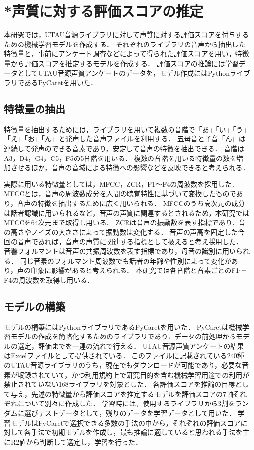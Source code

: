 \documentclass[a4j,8pt,twocolumn]{extarticle}
\begin{document}
\section{*声質に対する評価スコアの推定}
本研究では，UTAU音源ライブラリに対して声質に対する評価スコアを付与するための機械学習モデルを作成する．
それぞれのライブラリの音声から抽出した特徴量と，事前にアンケート調査などによって得られた評価スコアを用い，特徴量から評価スコアを推定するモデルを作成する．
評価スコアの推論には学習データとしてUTAU音源声質アンケートのデータを，モデル作成にはPythonライブラリであるPyCaretを用いた．

\subsection{特徴量の抽出}
特徴量を抽出するためには，ライブラリを用いて複数の音階で「あ」「い」「う」「え」「お」「ん」と発声した音声ファイルを利用する．
五母音と子音「ん」は連続して発声のできる音素であり，安定して音声の特徴を抽出できる．
音階はA3，D4，G4，C5，F5の5音階を用いる．
複数の音階を用いる特徴量の数を増加させるほか，音声の音域による特徴への影響などを反映できると考えられる．

実際に用いる特徴量としては，MFCC，ZCR，F1〜F4の周波数を採用した．
MFCCとは，音声の周波数成分を人間の聴覚特性に基づいて変換したものであり，音声の特徴を抽出するために広く用いられる．
MFCCのうち高次元の成分は話者認識に用いられるなど，音声の声質に関連するとされる\cite{}ため，本研究ではMFCCを64次元まで取得し用いる．
ZCRは音声の振動数を表す指標であり，音の高さやノイズの大きさによって振動数は変化する．
音声の声高を固定した今回の音声であれば，音声の声質に関連する指標として扱えると考え採用した．
音響フォルマントは音声の共振周波数を表す指標であり，母音の識別に用いられる．
同じ音素のフォルマント周波数でも話者の年齢や性別によって変化があり\cite{formant}，声の印象に影響があると考えられる．
本研究では各音階と音素ごとのF1〜F4の周波数を取得し用いる．

\subsection{モデルの構築}
モデルの構築にはPythonライブラリであるPyCaretを用いた．
PyCaretは機械学習モデルの作成を簡略化するためのライブラリであり，データの前処理からモデルの選定，評価までを一連の流れで行える．
UTAU音源声質アンケートの結果はExcelファイルとして提供されている．
このファイルに記載されている240種のUTAU音源ライブラリのうち，現在でもダウンロードが可能であり，必要な音素が収録されていて，かつ利用規約上で研究目的を含む機械学習用途での利用が禁止されていない168ライブラリを対象とした．
各評価スコアを推論の目標として与え，先述の特徴量から評価スコアを推定するモデルを評価スコアの7軸それぞれについて別々に作成した．
学習時には，使用するライブラリから3割をランダムに選びテストデータとして，残りのデータを学習データとして用いた．
学習モデルはPyCaretで選択できる多数の手法の中から，それぞれの評価スコアに対して各手法で初期モデルを作成し，最も推論に適していると思われる手法を主にR2値から判断して選定し，学習を行った．
\end{document}
